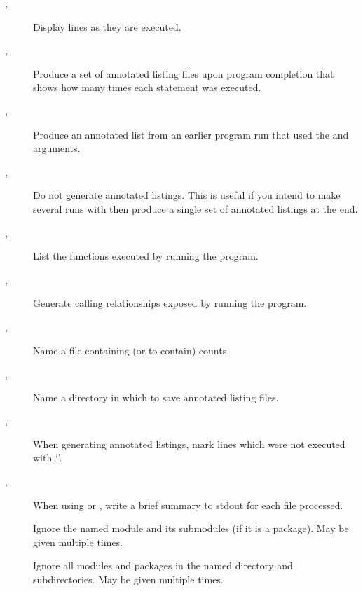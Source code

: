 \begin{description}
\item[, ]
Display lines as they are executed.

\item[, ]
Produce a set of  annotated listing files upon program
completion that shows how many times each statement was executed.

\item[, ]
Produce an annotated list from an earlier program run that
used the  and  arguments.

\item[, ]
Do not generate annotated listings.  This is useful if you intend to make
several runs with  then produce a single set
of annotated listings at the end.

\item[, ]
List the functions executed by running the program.

\item[, ]
Generate calling relationships exposed by running the program.

\item[, ]
Name a file containing (or to contain) counts.

\item[, ]
Name a directory in which to save annotated listing files.

\item[, ]
When generating annotated listings, mark lines which
were not executed with `\code{>>>>>>}'.

\item[, ]
When using  or , write a
brief summary to stdout for each file processed.

\item[]
Ignore the named module and its submodules (if it is
a package).  May be given multiple times.

\item[]
Ignore all modules and packages in the named directory
and subdirectories.  May be given multiple times.
\end{description}

